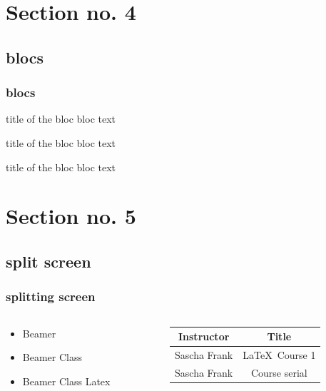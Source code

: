 \documentclass{beamer}
\begin{document}
\section{Section no. 4}
\subsection{blocs}
\begin{frame}\frametitle{blocs}

\begin{block}{title of the bloc}
bloc text
\end{block}

\begin{exampleblock}{title of the bloc}
bloc text
\end{exampleblock}


\begin{alertblock}{title of the bloc}
bloc text
\end{alertblock}
\end{frame}

\section{Section no. 5}
\subsection{split screen}

\begin{frame}\frametitle{splitting screen}
\begin{columns}
\begin{column}{5cm}
\begin{itemize}
\item Beamer 
\item Beamer Class 
\item Beamer Class Latex 
\end{itemize}
\end{column}
\begin{column}{5cm}
\begin{tabular}{|c|c|}
\hline
\textbf{Instructor} & \textbf{Title} \\
\hline
Sascha Frank &  \LaTeX \ Course 1 \\
\hline
Sascha Frank &  Course serial  \\
\hline
\end{tabular}
\end{column}
\end{columns}
\end{frame}
\end{document}
